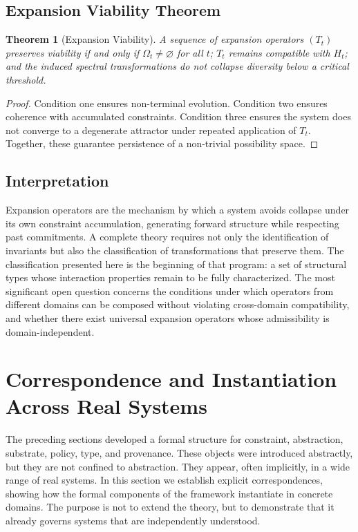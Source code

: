\documentclass[12pt, a4paper]{article}
\theoremstyle{plain}
\newtheorem{theorem}{Theorem}[section]
\theoremstyle{definition}
\theoremstyle{remark}
\begin{document}
\subsection{Expansion Viability Theorem}

\begin{theorem}[Expansion Viability]
A sequence of expansion operators $(T_t)$ preserves viability if and only if $\Omega_t \neq \varnothing$ for all $t$; $T_t$ remains compatible with $H_t$; and the induced spectral transformations do not collapse diversity below a critical threshold.
\end{theorem}

\begin{proof}
Condition one ensures non-terminal evolution. Condition two ensures coherence with accumulated constraints. Condition three ensures the system does not converge to a degenerate attractor under repeated application of $T_t$. Together, these guarantee persistence of a non-trivial possibility space.
\end{proof}

\subsection{Interpretation}

Expansion operators are the mechanism by which a system avoids collapse under its own constraint accumulation, generating forward structure while respecting past commitments. A complete theory requires not only the identification of invariants but also the classification of transformations that preserve them. The classification presented here is the beginning of that program: a set of structural types whose interaction properties remain to be fully characterized. The most significant open question concerns the conditions under which operators from different domains can be composed without violating cross-domain compatibility, and whether there exist universal expansion operators whose admissibility is domain-independent.

\section{Correspondence and Instantiation Across Real Systems}

The preceding sections developed a formal structure for constraint, abstraction, substrate, policy, type, and provenance. These objects were introduced abstractly, but they are not confined to abstraction. They appear, often implicitly, in a wide range of real systems. In this section we establish explicit correspondences, showing how the formal components of the framework instantiate in concrete domains. The purpose is not to extend the theory, but to demonstrate that it already governs systems that are independently understood.
\end{document}
